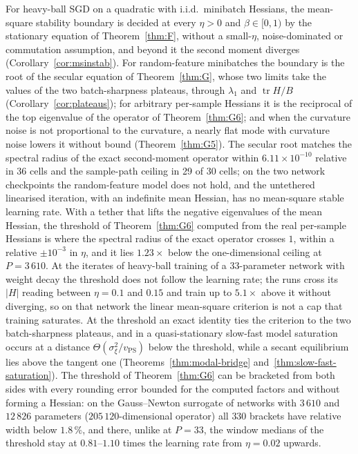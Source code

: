 \documentclass[11pt]{article}
\theoremstyle{remark}
\newcommand{\tr}{\operatorname{tr}}
\begin{document}
For heavy-ball SGD on a quadratic with i.i.d.\ minibatch Hessians, the mean-square stability boundary is decided at every $\eta>0$ and $\beta\in[0,1)$ by the stationary equation of Theorem~\ref{thm:F}, without a small-$\eta$, noise-dominated or commutation assumption, and beyond it the second moment diverges (Corollary~\ref{cor:msinstab}). For random-feature minibatches the boundary is the root of the secular equation of Theorem~\ref{thm:G}, whose two limits take the values of the two batch-sharpness plateaus, through $\lambda_1$ and $\tr H/B$ (Corollary~\ref{cor:plateaus}); for arbitrary per-sample Hessians it is the reciprocal of the top eigenvalue of the operator of Theorem~\ref{thm:G6}; and when the curvature noise is not proportional to the curvature, a nearly flat mode with curvature noise lowers it without bound (Theorem~\ref{thm:G5}). The secular root matches the spectral radius of the exact second-moment operator within $6.11\times10^{-10}$ relative in 36 cells and the sample-path ceiling in 29 of 30 cells; on the two network checkpoints the random-feature model does not hold, and the untethered linearised iteration, with an indefinite mean Hessian, has no mean-square stable learning rate. With a tether that lifts the negative eigenvalues of the mean Hessian, the threshold of Theorem~\ref{thm:G6} computed from the real per-sample Hessians is where the spectral radius of the exact operator crosses $1$, within a relative $\pm10^{-3}$ in $\eta$, and it lies $1.23\times$ below the one-dimensional ceiling at $P=3\,610$. At the iterates of heavy-ball training of a $33$-parameter network with weight decay the threshold does not follow the learning rate; the runs cross its $|H|$ reading between $\eta=0.1$ and $0.15$ and train up to $5.1\times$ above it without diverging, so on that network the linear mean-square criterion is not a cap that training saturates. At the threshold an exact identity ties the criterion to the two batch-sharpness plateaus, and in a quasi-stationary slow-fast model saturation occurs at a distance $\Theta(\sigma_\xi^2/v_{\mathrm{PS}})$ below the threshold, while a secant equilibrium lies above the tangent one (Theorems~\ref{thm:modal-bridge} and~\ref{thm:slow-fast-saturation}). The threshold of Theorem~\ref{thm:G6} can be bracketed from both sides with every rounding error bounded for the computed factors and without forming a Hessian: on the Gauss--Newton surrogate of networks with $3\,610$ and $12\,826$ parameters ($205\,120$-dimensional operator) all $330$ brackets have relative width below $1.8\,\%$, and there, unlike at $P=33$, the window medians of the threshold stay at $0.81$--$1.10$ times the learning rate from $\eta=0.02$ upwards.
\end{document}
